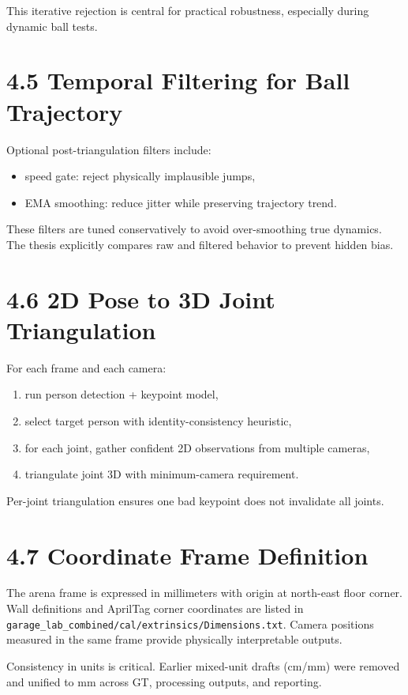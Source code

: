 This iterative rejection is central for practical robustness, especially during dynamic ball tests.

\section{4.5 Temporal Filtering for Ball Trajectory}
Optional post-triangulation filters include:
\begin{itemize}
  \item speed gate: reject physically implausible jumps,
  \item EMA smoothing: reduce jitter while preserving trajectory trend.
\end{itemize}

These filters are tuned conservatively to avoid over-smoothing true dynamics. The thesis explicitly compares raw and filtered behavior to prevent hidden bias.

\section{4.6 2D Pose to 3D Joint Triangulation}
For each frame and each camera:
\begin{enumerate}
  \item run person detection + keypoint model,
  \item select target person with identity-consistency heuristic,
  \item for each joint, gather confident 2D observations from multiple cameras,
  \item triangulate joint 3D with minimum-camera requirement.
\end{enumerate}

Per-joint triangulation ensures one bad keypoint does not invalidate all joints.

\section{4.7 Coordinate Frame Definition}
The arena frame is expressed in millimeters with origin at north-east floor corner. Wall definitions and AprilTag corner coordinates are listed in \texttt{garage\_lab\_combined/cal/extrinsics/Dimensions.txt}. Camera positions measured in the same frame provide physically interpretable outputs.

Consistency in units is critical. Earlier mixed-unit drafts (cm/mm) were removed and unified to mm across GT, processing outputs, and reporting.

